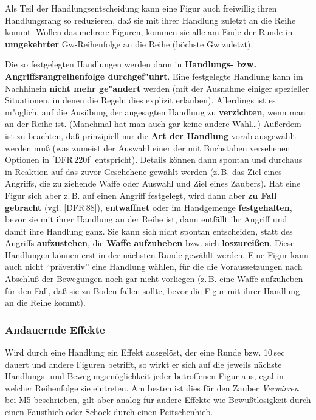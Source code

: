\documentclass[10pt,a4paper,germanpar]{article}
\begin{document}
Als Teil der Handlungsentscheidung kann eine Figur auch freiwillig
ihren Handlungsrang so reduzieren, daß sie mit ihrer Handlung zuletzt
an die Reihe kommt. Wollen das mehrere Figuren, kommen sie alle am
Ende der Runde in \textbf{umgekehrter} Gw-Reihenfolge an die Reihe
(höchste Gw zuletzt).

Die so festgelegten Handlungen werden dann in \textbf{Handlungs-
  bzw. Angriffsrangreihenfolge durchgef"uhrt}. Eine festgelegte
Handlung kann im Nachhinein \textbf{nicht mehr ge"andert} werden (mit
der Ausnahme einiger spezieller Situationen, in denen die Regeln dies
explizit erlauben). Allerdings ist es m"oglich, auf die Ausübung der
angesagten Handlung zu \textbf{verzichten}, wenn man an der Reihe
ist. (Manchmal hat man auch gar keine andere Wahl\dots) Außerdem ist
zu beachten, daß prinzipiell nur die \textbf{Art der Handlung} vorab
ausgewählt werden muß (was zumeist der Auswahl einer der mit
Buchstaben versehenen Optionen in [DFR\,220f] entspricht). Details
können dann spontan und durchaus in Reaktion auf das zuvor Geschehene
gewählt werden (z.\,B. das Ziel eines Angriffs, die zu ziehende Waffe
oder Auswahl und Ziel eines Zaubers).
Hat eine Figur sich aber z.\,B. auf einen Angriff festgelegt, wird
dann aber \textbf{zu Fall gebracht} (vgl. [DFR\,88]),
\textbf{entwaffnet} oder im Handgemenge \textbf{festgehalten}, bevor
sie mit ihrer Handlung an der Reihe ist, dann entfällt ihr Angriff und
damit ihre Handlung ganz. Sie kann sich nicht spontan entscheiden,
statt des Angriffs \textbf{aufzustehen}, die \textbf{Waffe aufzuheben}
bzw. sich \textbf{loszureißen}. Diese Handlungen können erst in der
nächsten Runde gewählt werden. Eine Figur kann auch nicht
"`präventiv"' eine Handlung wählen, für die die Voraussetzungen nach
Abschluß der Bewegungen noch gar nicht vorliegen (z.\,B. eine Waffe
aufzuheben für den Fall, daß sie zu Boden fallen sollte, bevor die
Figur mit ihrer Handlung an die Reihe kommt).

\subsubsection{Andauernde Effekte}

Wird durch eine Handlung ein Effekt ausgelöst, der eine Runde
bzw. 10\,sec dauert und andere Figuren betrifft, so wirkt er sich auf
die jeweils nächste Handlungs- und Bewegungsmöglichkeit jeder
betroffenen Figur aus, egal in welcher Reihenfolge sie eintreten. Am
besten ist dies für den Zauber \emph{Verwirren} bei M5 beschrieben,
gilt aber analog für andere Effekte wie Bewußtlosigkeit durch einen
Fausthieb oder Schock durch einen Peitschenhieb.
\end{document}
